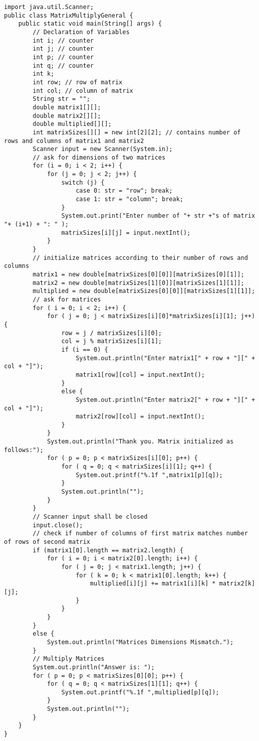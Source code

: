\lstset{language=Java,tabsize=2}
\begin{lstlisting}
import java.util.Scanner;
public class MatrixMultiplyGeneral {
	public static void main(String[] args) {
		// Declaration of Variables
		int i; // counter
		int j; // counter
		int p; // counter
		int q; // counter
		int k;
		int row; // row of matrix
		int col; // column of matrix
		String str = "";
		double matrix1[][];
		double matrix2[][];
		double multiplied[][];
		int matrixSizes[][] = new int[2][2]; // contains number of rows and columns of matrix1 and matrix2
		Scanner input = new Scanner(System.in);
		// ask for dimensions of two matrices
		for (i = 0; i < 2; i++) {
			for (j = 0; j < 2; j++) {
				switch (j) {
					case 0: str = "row"; break;
					case 1: str = "column"; break;
				}
				System.out.print("Enter number of "+ str +"s of matrix "+ (i+1) + ": " );
				matrixSizes[i][j] = input.nextInt();
			}
		}
		// initialize matrices according to their number of rows and columns
		matrix1 = new double[matrixSizes[0][0]][matrixSizes[0][1]];
		matrix2 = new double[matrixSizes[1][0]][matrixSizes[1][1]];
		multiplied = new double[matrixSizes[0][0]][matrixSizes[1][1]];
		// ask for matrices
		for ( i = 0; i < 2; i++) {
			for ( j = 0; j < matrixSizes[i][0]*matrixSizes[i][1]; j++) {
				row = j / matrixSizes[i][0];
				col = j % matrixSizes[i][1];
				if (i == 0) {
					System.out.println("Enter matrix1[" + row + "][" + col + "]");
					matrix1[row][col] = input.nextInt();					
				}
				else {
					System.out.println("Enter matrix2[" + row + "][" + col + "]");
					matrix2[row][col] = input.nextInt();					
				}
			}
			System.out.println("Thank you. Matrix initialized as follows:");
			for ( p = 0; p < matrixSizes[i][0]; p++) {
				for ( q = 0; q < matrixSizes[i][1]; q++) {
					System.out.printf("%.1f ",matrix1[p][q]);
				}
				System.out.println("");
			}
		}
		// Scanner input shall be closed
		input.close();
		// check if number of columns of first matrix matches number of rows of second matrix
		if (matrix1[0].length == matrix2.length) {
			for ( i = 0; i < matrix2[0].length; i++) {
				for ( j = 0; j < matrix1.length; j++) {
					for ( k = 0; k < matrix1[0].length; k++) {
						multiplied[i][j] += matrix1[i][k] * matrix2[k][j];
					}
				}
			}
		}
		else {
			System.out.println("Matrices Dimensions Mismatch.");
		}
		// Multiply Matrices
		System.out.println("Answer is: ");
		for ( p = 0; p < matrixSizes[0][0]; p++) {
			for ( q = 0; q < matrixSizes[1][1]; q++) {
				System.out.printf("%.1f ",multiplied[p][q]);
			}
			System.out.println("");
		}	
	}	
}
\end{lstlisting}